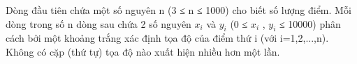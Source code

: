 Dòng đầu tiên chứa một số nguyên n (3 ≤ n ≤ 1000) cho biết số lượng điểm. Mỗi dòng trong số n dòng sau chứa 2 số nguyên $x_{i}$   và $y_{i}$   (0 ≤ $x_{i}$   , $y_{i}$   ≤ 10000) phân cách bởi một khoảng trắng xác định tọa độ của điểm thứ i (với i=1,2,...,n). Không có cặp (thứ tự) tọa độ nào xuất hiện nhiều hơn một lần.